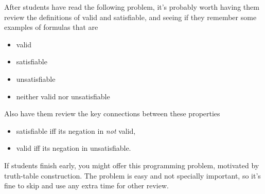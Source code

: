 \documentclass[handout]{mcs}
\begin{document}


\insolutions{\newpage}


\begin{staffnotes}
After students have read the following problem, it's probably worth
having them review the definitions of valid and satisfiable, and seeing
if they remember some examples of formulas that are
\begin{itemize}
\item valid
\item satisfiable
\item unsatisfiable
\item neither valid nor unsatisfiable
\end{itemize}
Also have them review the key connections between these properties
\begin{itemize}
 \item satisfiable iff its negation in \emph{not} valid,
 \item valid iff its negation in unsatisfiable.
\end{itemize}
\end{staffnotes}





\begin{staffnotes}
If students finish early, you might offer this programming problem,
motivated by truth-table construction.  The problem is easy and not
specially important, so it's fine to skip and use any extra time for
other review.
\end{staffnotes}
\iffalse

\begin{center}
\textbf{Supplmental Problem}\footnote{There is no need to study supplmental
  problems when preparing for quizzes or exams.}
\end{center}
\fi


\end{document}
